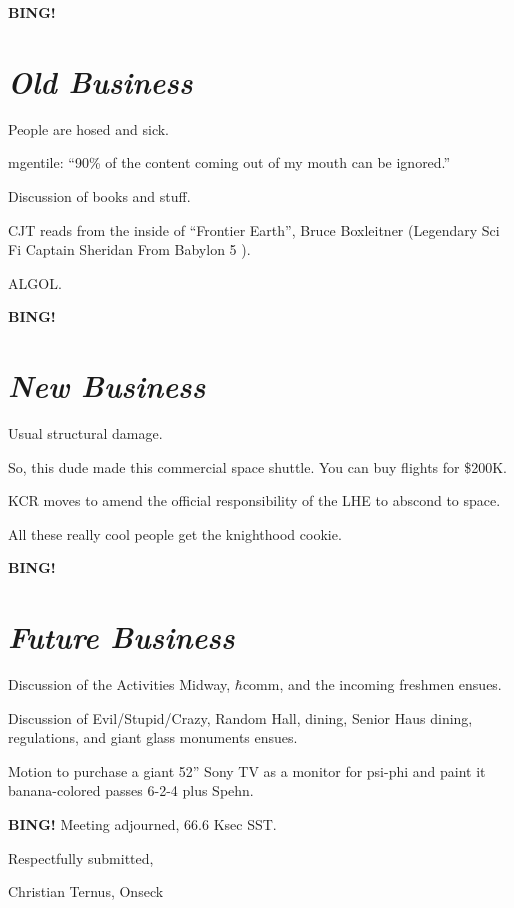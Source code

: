 \documentclass[10pt]{article}
\newcommand{\bing}{{\bf BING!} }
\newcommand{\goto}[1]{\bing \vskip 12pt \section*{{\em{#1}}}}
\newcommand{\ps}{ plus Spehn\xspace}
\begin{document}
\goto{Old Business}

People are hosed and sick.

mgentile: ``90\% of the content coming out of my mouth can be
ignored.''

Discussion of books and stuff.

CJT reads from the inside of ``Frontier Earth'', Bruce Boxleitner
(Legendary Sci Fi Captain Sheridan From Babylon 5 \texttrademark{}).

ALGOL.

\goto{New Business}

Usual structural damage.

So, this dude made this commercial space shuttle.  You can buy flights
for \$200K. 

KCR moves to amend the official responsibility of the LHE to abscond
to space.

All these really cool people get the knighthood cookie.

\goto{Future Business}

Discussion of the Activities Midway, $\hbar$comm, and the incoming
freshmen ensues.

Discussion of Evil/Stupid/Crazy, Random Hall, dining, Senior Haus
dining, regulations, and giant glass monuments ensues.

Motion to purchase a giant 52'' Sony TV as a monitor for psi-phi and paint it banana-colored passes 6-2-4 \ps.

\bing
\noindent
Meeting adjourned, 66.6 Ksec SST.

\vspace{18pt}

\centerline{Respectfully submitted,}
\centerline{Christian Ternus, Onseck}
\end{document}
